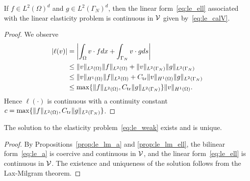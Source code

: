 \begin{proposition}
  \label{prop:le_lm_ell}
  If $f \in L^2(\Omega)^d$ and $g \in L^2(\Gamma_N)^d$, then the linear form~\eqref{eq:le_ell} associated with the linear elasticity problem is continuous in $\mathcal{V}$ given by~\eqref{eq:le_calV}.
  \begin{proof}
    We observe
    \begin{align*}
    | \ell(v) | &= \left| \int_{\Omega} v \cdot f dx + \int_{\Gamma_N} v \cdot g ds \right|\\
    &\leq \| v \|_{L^2(\Omega)} \| f \|_{L^2(\Omega)} + \| v \|_{L^2(\Gamma_N)} \| g \|_{L^2(\Gamma_N)}\\
    &\leq \| v \|_{H^1(\Omega)} \| f \|_{L^2(\Omega)} + C_{\rm tr} \| v \|_{H^1(\Omega)} \| g \|_{L^2(\Gamma_N)}\\
    &\leq \max\{ \| f \|_{L^2(\Omega)}, C_{\rm tr} \| g \|_{L^2(\Gamma_N)} \} \| v \|_{H^1(\Omega)}.
    \end{align*}
    Hence $\ell(\cdot)$ is continuous with a continuity constant $c = \max\{ \| f \|_{L^2(\Omega)}, C_{\rm tr} \| g \|_{L^2(\Gamma_N)} \}$.
  \end{proof}
\end{proposition}
\begin{proposition}
  The solution to the elasticity problem~\eqref{eq:le_weak} exists and is unique.
  \begin{proof}
    By Propositions~\ref{prop:le_lm_a} and \ref{prop:le_lm_ell}, the bilinear form~\eqref{eq:le_a} is coercive and continuous in $\mathcal{V}$, and the linear form~\eqref{eq:le_ell} is continuous in $\mathcal{V}$.  The existence and  uniqueness of the solution follows from the Lax-Milgram theorem.
  \end{proof}
\end{proposition}

